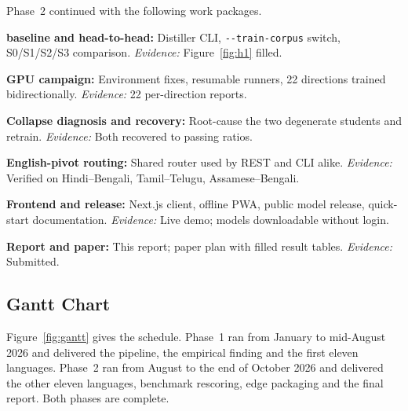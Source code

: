 Phase~2 continued with the following work packages.

\begin{bullets}
\item \textbf{\seqkd{} baseline and head-to-head:} Distiller CLI, \texttt{-{}-train-corpus} switch, S0/S1/S2/S3 comparison. \emph{Evidence:} Figure~\ref{fig:h1} filled.
\item \textbf{GPU campaign:} Environment fixes, resumable runners, 22 directions trained bidirectionally. \emph{Evidence:} 22 per-direction reports.
\item \textbf{Collapse diagnosis and recovery:} Root-cause the two degenerate students and retrain. \emph{Evidence:} Both recovered to passing ratios.
\item \textbf{English-pivot routing:} Shared router used by REST and CLI alike. \emph{Evidence:} Verified on Hindi--Bengali, Tamil--Telugu, Assamese--Bengali.
\item \textbf{Frontend and release:} Next.js client, offline PWA, public model release, quick-start documentation. \emph{Evidence:} Live demo; models downloadable without login.
\item \textbf{Report and paper:} This report; paper plan with filled result tables. \emph{Evidence:} Submitted.
\end{bullets}

\subsection{Gantt Chart}
\label{subsec:gantt}

\enlargethispage{\baselineskip}
Figure~\ref{fig:gantt} gives the schedule. Phase~1 ran from January to
mid-August 2026 and delivered the pipeline, the empirical finding and the first
eleven languages. Phase~2 ran from August to the end of October 2026 and
delivered the other eleven languages, benchmark rescoring, edge packaging
and the final report. Both phases are complete.

